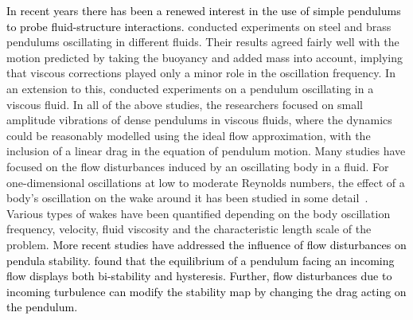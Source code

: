 \documentclass{jfm}
\begin{document}
\textcolor{black}{In recent years there has been a renewed interest in the use of simple pendulums to probe fluid-structure interactions.}
\cite{neill2007pendulum} conducted experiments on steel and brass pendulums oscillating in different fluids. Their results agreed fairly well with the motion predicted by taking the buoyancy and added mass into account, implying that viscous corrections played only a minor role in the oscillation frequency. 
In an extension to this, \cite{bolster2010oscillating} conducted experiments on a  pendulum oscillating in a viscous fluid.
In all of the above studies, the researchers focused on small amplitude vibrations of dense pendulums in viscous fluids, where the dynamics could be reasonably modelled using the ideal flow approximation, with the inclusion of a linear drag in the equation of pendulum motion.  {\color{black}Many studies have focused on the flow disturbances induced by an oscillating body in a fluid. For one-dimensional oscillations at low to moderate Reynolds numbers, the effect of a body's oscillation on the wake around it has been studied in some detail~\citep{tatsuno1990visual,tatsuno1993wavy}. Various types of wakes have been quantified depending on the body oscillation frequency, velocity, fluid viscosity and the characteristic length scale of the problem.} \textcolor{black}{More recent studies have addressed the influence of flow disturbances on pendula stability. \cite{obligado2013bi} found that the equilibrium of a pendulum facing an incoming flow displays both bi-stability and hysteresis. Further, flow disturbances due to incoming turbulence can modify the stability map by changing the drag acting on the pendulum. }
\end{document}
